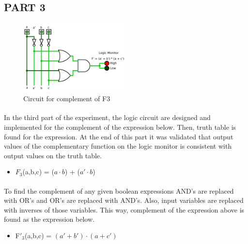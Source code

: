 \documentclass[pdftex,12pt,a4paper]{article}
\begin{document}
\begin{flushleft}
\subsection{PART 3}

\begin{figure}[!h]
	\centering
	\includegraphics[width=0.5\textwidth]{part3.png}	
	\caption{Circuit for complement of F3}
	\label{fig1}
\end{figure}

\paragraph{}
In the third part of the experiment, the logic circuit are designed and implemented for the complement of the expression below. Then, truth table is found for the expression. At the end of this part it was validated that output values of the complementary function on the logic monitor is consistent with output values on the truth table.
\begin{itemize}
    \item $F_{3}$(a,b,c) = ($a \cdot b$) + ($a' \cdot b$)
\end{itemize}

\paragraph{}
To find the complement of any given boolean expressions AND's are replaced with OR's and OR's are replaced with AND's. Also, input variables are replaced with inverses of those variables. This way, complement of the expression above is found  as the expression below. 
\begin{itemize}
    \item F$'_{3}$(a,b,c) = $(a' + b') \cdot (a + c')$
\end{itemize}


\end{flushleft}
\end{document}
